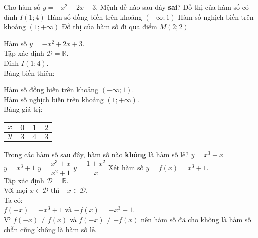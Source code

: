 \begin{ex}%
 Cho hàm số $y = -x^2 + 2x + 3$. Mệnh đề nào sau đây \textbf{sai}?
 \choice
  {Đồ thị của hàm số có đỉnh $I(1;4)$}
  {Hàm số đồng biến trên khoảng $(-\infty; 1)$}
  {Hàm số nghịch biến trên khoảng $(1; +\infty)$}
  {\True Đồ thị của hàm số đi qua điểm $M(2;2)$}
 \loigiai
 {
 Hàm số $y = -x^2 + 2x + 3$.\\
 Tập xác định $\mathscr{D} = \mathbb{R}$.\\
 Đỉnh $I(1;4)$.\\
 Bảng biến thiên:
 \begin{center}
 \end{center}
 Hàm số đồng biến trên khoảng $(-\infty;1)$.\\
 Hàm số nghịch biến trên khoảng $(1; +\infty)$.\\
 Bảng giá trị:
 \begin{center}
  \begin{tabular}{|c|c|c|c|}
   \hline
   $x$ & $0$ & $1$ & $2$\\
   \hline
   $y$ & $3$ & $4$ & $3$\\
   \hline
  \end{tabular}
 \end{center}
 }
\end{ex}


\begin{ex}%
 Trong các hàm số sau đây, hàm số nào \textbf{không} là hàm số lẻ?
 \choice
  {$y = x^3 - x$}
  {\True $y = x^3 + 1$}
  {$y = \dfrac{x^3 + x}{x^2 + 1}$}
  {$y = \dfrac{1 + x^2}{x}$}
 \loigiai
 {
 Xét hàm số $y = f(x) = x^3 + 1$.\\
 Tập xác định $\mathscr{D} = \mathbb{R}$.\\
 Với mọi $x \in \mathscr{D}$ thì $-x \in \mathscr{D}$.\\
 Ta có:\\
 $f(-x) = -x^3 + 1$ và $-f(x) = -x^3 - 1$.\\
 Vì $f(-x) \neq f(x)$ và $f(-x) \neq -f(x)$ nên hàm số đã cho không là hàm số chẵn cũng không là hàm số lẻ.
 }
\end{ex}


